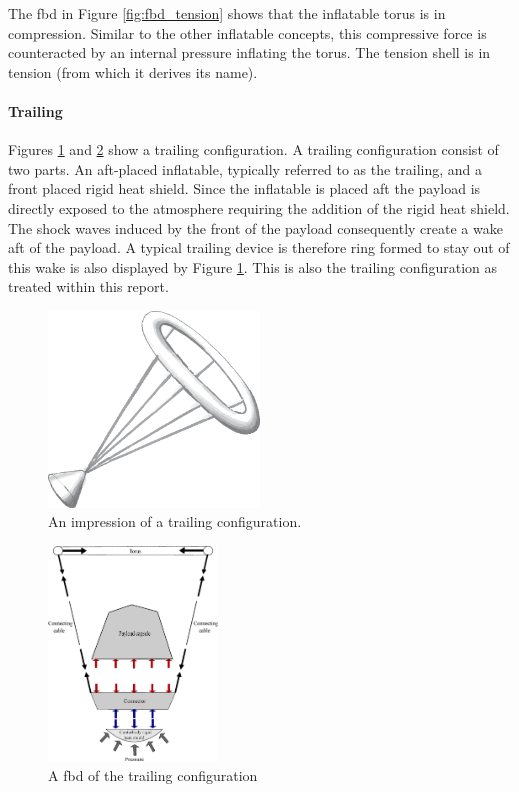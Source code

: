 The \gls{fbd} in Figure  \ref{fig:fbd_tension} shows that the inflatable torus is in compression. Similar to the other inflatable concepts, this compressive force is counteracted by an internal pressure inflating the torus. The tension shell is in tension (from which it derives its name). 

\paragraph{Trailing}

Figures \ref{fig:conc_trailing} and \ref{fig:fbd_trailing} show a trailing configuration. A trailing configuration consist of two parts. An aft-placed inflatable, typically referred to as the trailing, and a front placed rigid heat shield. Since the inflatable is placed aft the payload is directly exposed to the atmosphere requiring the addition of the rigid heat shield. The shock waves induced by the front of the payload consequently create a wake aft of the payload. A typical trailing device is therefore ring formed to stay out of this wake is also displayed by Figure  \ref{fig:conc_trailing}. This is also the trailing configuration as treated within this report.

\begin{figure}[H]
\centering
\includegraphics[width = 0.5\textwidth]{Figure/trailing_ballute.eps}

\caption{An impression of a trailing configuration.}

\label{fig:conc_trailing}
\end{figure}

\begin{figure}[H]
\centering
\includegraphics[width = 0.4\textwidth]{Figure/FBD_trailing.eps}
\caption{A \gls{fbd} of the trailing configuration}
\label{fig:fbd_trailing}
\end{figure}

